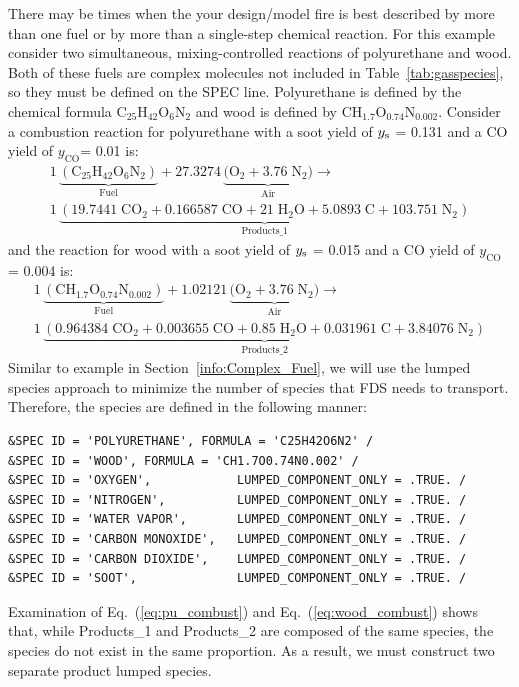 \documentclass[11pt]{book}
\begin{document}
There may be times when the your design/model fire is best described by more than one fuel or by more than a single-step chemical reaction. For this example consider two simultaneous, mixing-controlled reactions of polyurethane and wood. Both of these fuels are complex molecules not included in Table~\ref{tab:gasspecies}, so they must be defined on the {\ct SPEC line}. Polyurethane is defined by the chemical formula C$_{25}$H$_{42}$O$_{6}$N$_{2}$ and wood is defined by CH$_{1.7}$O$_{0.74}$N$_{0.002}$. Consider a combustion reaction for polyurethane with a soot yield of $y_{\rm s}$ = 0.131 and a CO yield of $y_{\mathrm{CO}}$= 0.01 \cite{SFPE:Tewarson} is:
\begin{multline}\label{eq:pu_combust}
1\,\underbrace{\mathrm{(C_{25}H_{42}O_{6}N_{2})}}_\text{Fuel} + 27.3274\,\underbrace{\mathrm{(O_2 + 3.76 \; N_2})}_\text{Air} \longrightarrow \\
1\,\underbrace{\mathrm{(19.7441\; CO_2 + 0.166587 \; CO + 21 \; H_2O + 5.0893\; C + 103.751 \; N_2)}}_\text{Products\_1}
\end{multline}
and the reaction for wood with a soot yield of $y_{\rm s}$ = 0.015 and a CO yield of $y_{\mathrm{CO}}$= 0.004 \cite{SFPE:Tewarson} is:
\begin{multline}\label{eq:wood_combust}
1\,\underbrace{\mathrm{(CH_{1.7}O_{0.74}N_{0.002})}}_\text{Fuel} + 1.02121\,\underbrace{\mathrm{(O_2 + 3.76 \; N_2})}_\text{Air} \longrightarrow \\
1\,\underbrace{\mathrm{(0.964384\; CO_2 + 0.003655 \; CO + 0.85 \; H_2O + 0.031961\; C + 3.84076 \; N_2)}}_\text{Products\_2}
\end{multline}
Similar to example in Section~\ref{info:Complex_Fuel}, we will use the lumped species approach to minimize the number of species that FDS needs to transport. Therefore, the species are defined in the following manner:
\begin{lstlisting}
&SPEC ID = 'POLYURETHANE', FORMULA = 'C25H42O6N2' /
&SPEC ID = 'WOOD', FORMULA = 'CH1.7O0.74N0.002' /
&SPEC ID = 'OXYGEN',            LUMPED_COMPONENT_ONLY = .TRUE. /
&SPEC ID = 'NITROGEN',          LUMPED_COMPONENT_ONLY = .TRUE. /
&SPEC ID = 'WATER VAPOR',       LUMPED_COMPONENT_ONLY = .TRUE. /
&SPEC ID = 'CARBON MONOXIDE',   LUMPED_COMPONENT_ONLY = .TRUE. /
&SPEC ID = 'CARBON DIOXIDE',    LUMPED_COMPONENT_ONLY = .TRUE. /
&SPEC ID = 'SOOT',              LUMPED_COMPONENT_ONLY = .TRUE. /
\end{lstlisting}
Examination of Eq.~(\ref{eq:pu_combust}) and Eq.~(\ref{eq:wood_combust}) shows that, while Products\_1 and Products\_2 are composed of the same species, the species do not exist in the same proportion. As a result, we must construct two separate product lumped species.
\end{document}
